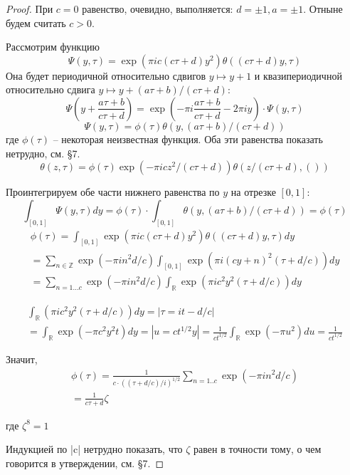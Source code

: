 \documentclass{article}
\newcommand{\ZZ}{\mathbb{Z}}
\newcommand{\RR}{\mathbb{R}}
\theoremstyle{break}
\begin{document}
\begin{proof}
	При $c=0$ равенство, очевидно, выполняется: $d=\pm 1, a=\pm 1$. 
	Отныне будем считать $c > 0$.
	
	Рассмотрим функцию
	$$
		\Psi(y, \tau) = \exp(\pi i c (c\tau + d) y^2) \theta((c\tau + d)y, \tau)
	$$
	Она будет периодичной относительно сдвигов $y \mapsto y + 1$ и квазипериодичной относительно сдвига $y \mapsto y + (a\tau+b)/(c\tau + d)$:
	$$
		\Psi(y + \frac{a\tau+b}{c\tau+d}) 
		= \exp(-\pi i \frac{a\tau+b}{c\tau+d} - 2\pi i y) \cdot \Psi(y, \tau)
	$$
	$$
	\Psi(y, \tau) = \phi(\tau)\theta(y, (a\tau + b)/(c\tau+d))
	$$
	где $\phi(\tau)$ -- некоторая неизвестная функция.
	Оба эти равенства показать нетрудно, см. \cite{mumford} \S 7.
	$$
	\theta(z, \tau)=\phi(\tau)\exp(-\pi i cz^2/(c\tau+d)) 
	\theta(z/(c\tau+d), ())
	$$
	
	Проинтегрируем обе части нижнего равенства по $y$ на отрезке $[0, 1]$:
	$$
	\int_{[0, 1]} \Psi(y, \tau) dy 
	= \phi(\tau) \cdot \int_{[0, 1]} \theta(y, (a\tau+b)/(c\tau + d))
	= \phi(\tau)
	$$
	\begin{gather*}
	\phi(\tau)
	= \int_{[0, 1]} \exp(\pi i c (c\tau + d) y^2) \theta((c\tau+d)y, \tau) dy \\
	= \sum_{n \in \ZZ} \exp(-\pi i n^2 d/c)  
		\int_{[0, 1]} \exp(\pi i (cy + n)^2(\tau+d/c))dy \\
	= \sum_{n = 1...c} \exp(-\pi i n^2 d/c) 
		\int_{\RR} \exp(\pi i c^2 y^2 (\tau + d/c)) dy
	\end{gather*}

\begin{gather*}
	\int_{\RR}(\pi i c^2 y^2 (\tau + d/c)) dy = |\tau=it-d/c| \\
	=\int_{\RR}\exp(-\pi c^2 y^2 t) dy = |u=ct^{1/2}y|
	= \frac{1}{ct^{1/2}} \int_{\RR} \exp(-\pi u^2) du = \frac{1}{ct^{1/2}}
\end{gather*}

	Значит, 
\begin{gather*}
	\phi(\tau)
	= \frac{1}{c \cdot ((\tau+d/c)/i)^{1/2}} 
	\sum_{n=1..c} \exp(-\pi i n^2 d/c) \\
	= \frac{1}{c\tau+d} \zeta
\end{gather*}

	где $\zeta^8=1$
	
	Индукцией по |c| нетрудно показать, что 
	$\zeta$ равен в точности тому, о чем говорится в утверждении, см. \cite{mumford} \S 7.
\end{proof}
\end{document}
